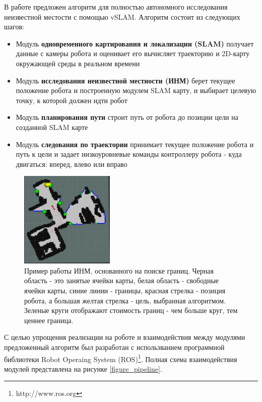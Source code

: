 \documentclass{mipt-thesis-ms}
\begin{document}
	В работе предложен алгоритм для полностью автономного исследования неизвестной местости с помощью vSLAM. Алгоритм состоит из следующих шагов: 
	
	\begin{itemize}
		\item Модуль \textbf{одновременного картирования и локализации (SLAM)} получает данные с камеры робота и оценивает его вычисляет траекторию и 2D-карту окружающей среды в реальном времени 
		\item Модуль \textbf{исследования неизвестной местности (ИНМ)} берет текущее положение робота и построенную модулем SLAM карту, и выбирает целевую точку, к которой должен идти робот 
		\item Модуль \textbf{планирования пути} строит путь от робота до позиции цели на созданной SLAM карте 
		\item Модуль \textbf{следования по траектории} принимает текущее положение робота и путь к цели и задает низкоуровневые команды контроллеру робота - куда двигаться: вперед, влево или вправо 
	\end{itemize}

	\begin{figure}
		\centering
		\includegraphics[width=0.4\textwidth]{img/exploration_sample.png}
		\caption{Пример работы ИНМ, основанного на поиске границ. Черная область - это занятые ячейки карты, белая область - свободные ячейки карты, синие линии - границы, красная стрелка - позиция робота, а большая желтая стрелка - цель, выбранная алгоритмом. Зеленые круги отображают стоимость границ - чем больше круг, тем ценнее граница. }
		\label{figure_frontiers}
	\end{figure}
	
	С целью упрощения реализации на роботе и взаимодействия между модулями предложенный алгоритм был разработан с использванием программной библиотеки Robot Operaing System (ROS)\footnote {http://www.ros.org}. Полная схема взаимодействия модулей представлена на рисунке \ref{figure_pipeline}.
	
\end{document}
